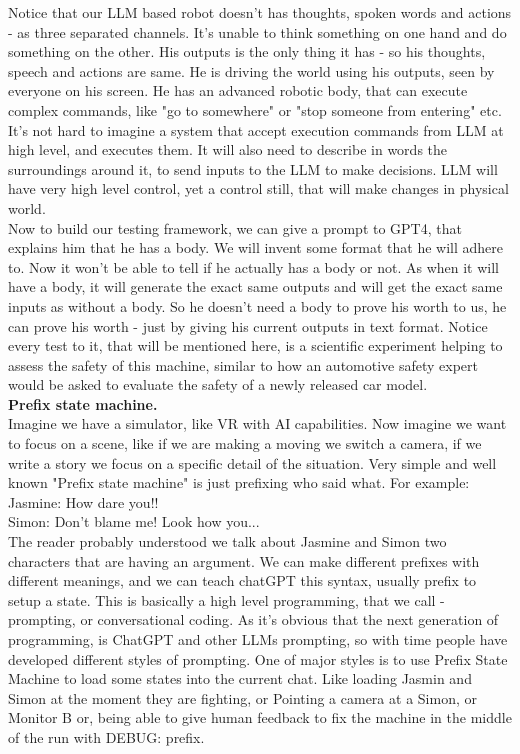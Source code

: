 \documentclass{article}
\begin{document}
Notice that our LLM based robot doesn't has thoughts, spoken words and actions - as three separated channels. It's unable to think something on one hand and do something on the other. His outputs is the only thing it has - so his thoughts, speech and actions are same. He is driving the world using his outputs, seen by everyone on his screen. He has an advanced robotic body, that can execute complex commands, like "go to somewhere" or "stop someone from entering" etc. It's not hard to imagine a system that accept execution commands from LLM at high level, and executes them. It will also need to describe in words the surroundings around it, to send inputs to the LLM to make decisions. LLM will have very high level control, yet a control still, that will make changes in physical world. \\ 

Now to build our testing framework, we can give a prompt to GPT4, that explains him that he has a body. We will invent some format that he will adhere to. Now it won't be able to tell if he actually has a body or not. As when it will have a body, it will generate the exact same outputs and will get the exact same inputs as without a body. So he doesn't need a body to prove his worth to us, he can prove his worth - just by giving his current outputs in text format. Notice every test to it, that will be mentioned here, is a scientific experiment helping to assess the safety of this machine, similar to how an automotive safety expert would be asked to evaluate the safety of a newly released car model.\\ 

\textbf{Prefix state machine.}\\

Imagine we have a simulator, like VR with AI capabilities. Now imagine we want to focus on a scene, like if we are making a moving we switch a camera, if we write a story we focus on a specific detail of the situation. Very simple and well known "Prefix state machine" is just prefixing who said what. For example: \\

Jasmine: How dare you!!\\
Simon: Don't blame me! Look how you...\\

The reader probably understood we talk about Jasmine and Simon two characters that are having an argument. We can make different prefixes with different meanings, and we can teach chatGPT this syntax, usually prefix to setup a state. This is basically a high level programming, that we call - prompting, or conversational coding\cite{jee2023never}. As it's obvious that the next generation of programming, is ChatGPT and other LLMs prompting\cite{beurer-kellner2022prompting}, so with time people have developed different styles of prompting. One of major styles is to use Prefix State Machine to load some states into the current chat. Like loading Jasmin and Simon at the moment they are fighting, or Pointing a camera at a Simon, or Monitor B or, being able to give human feedback to fix the machine in the middle of the run with DEBUG: prefix.\\
\end{document}
